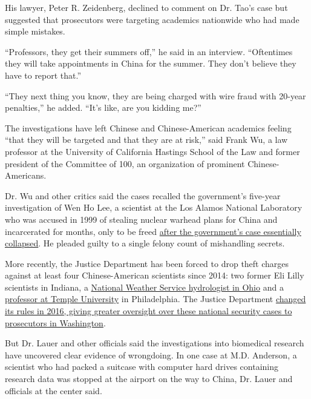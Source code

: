 His lawyer, Peter R. Zeidenberg, declined to comment on Dr. Tao's case
but suggested that prosecutors were targeting academics nationwide who
had made simple mistakes.

``Professors, they get their summers off,'' he said in an interview.
``Oftentimes they will take appointments in China for the summer. They
don't believe they have to report that.''

``They next thing you know, they are being charged with wire fraud with
20-year penalties,'' he added. ``It's like, are you kidding me?''

The investigations have left Chinese and Chinese-American academics
feeling ``that they will be targeted and that they are at risk,'' said
Frank Wu, a law professor at the University of California Hastings
School of the Law and former president of the Committee of 100, an
organization of prominent Chinese-Americans.

Dr. Wu and other critics said the cases recalled the government's
five-year investigation of Wen Ho Lee, a scientist at the Los Alamos
National Laboratory who was accused in 1999 of stealing nuclear warhead
plans for China and incarcerated for months, only to be freed
\href{https://www.nytimes.com/2001/02/04/us/the-making-of-a-suspect-the-case-of-wen-ho-lee.html}{after
the government's case essentially collapsed}. He pleaded guilty to a
single felony count of mishandling secrets.

More recently, the Justice Department has been forced to drop theft
charges against at least four Chinese-American scientists since 2014:
two former Eli Lilly scientists in Indiana, a
\href{https://www.nytimes.com/2015/05/10/business/accused-of-spying-for-china-until-she-wasnt.html}{National
Weather Service hydrologist in Ohio} and a
\href{https://www.nytimes.com/2015/09/12/us/politics/us-drops-charges-that-professor-shared-technology-with-china.html?module=inline}{professor
at Temple University} in Philadelphia. The Justice Department
\href{https://www.nytimes.com/2016/04/27/us/after-missteps-us-tightens-rules-for-national-security-cases.html}{changed
its rules in 2016, giving greater oversight over these national security
cases to prosecutors in Washington}.

But Dr. Lauer and other officials said the investigations into
biomedical research have uncovered clear evidence of wrongdoing. In one
case at M.D. Anderson, a scientist who had packed a suitcase with
computer hard drives containing research data was stopped at the airport
on the way to China, Dr. Lauer and officials at the center said.

